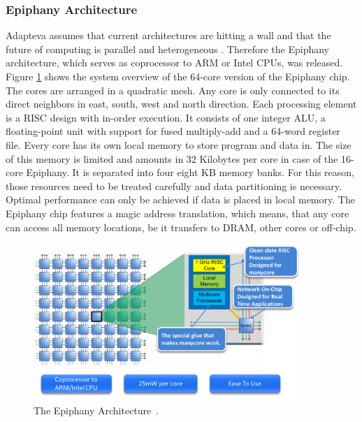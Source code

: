 \documentclass[american, hauptseminar, twoside]{zihpub}
\begin{document}
			\subsubsection{Epiphany Architecture}
				Adapteva assumes that current architectures are hitting a wall and that the future of computing is parallel and heterogeneous \cite{Adaptev2015a}. Therefore the Epiphany architecture, which serves as coprocessor to ARM or Intel CPUs, was released. Figure \ref{fig:epiphany} shows the system overview of the 64-core version of the Epiphany chip. The cores are arranged in a quadratic mesh. Any core is only connected to its direct neighbors in east, south, west and north direction. Each processing element is a RISC design with in-order execution. It consists of one integer ALU, a floating-point unit with support for fused multiply-add and a 64-word register file. Every core has its own local memory to store program and data in. The size of this memory is limited and amounts in 32 Kilobytes per core in case of the 16-core Epiphany. It is separated into four eight KB memory banks. For this reason, those resources need to be treated carefully and data partitioning is necessary. Optimal performance can only be achieved if data is placed in local memory. The Epiphany chip features a magic address translation, which means, that any core can access all memory locations, be it transfers to DRAM, other cores or off-chip. 
				\begin{figure}[H]
					\begin{center}
						\includegraphics[width=0.9\textwidth]{grafiken/epiphany.pdf}
						\caption{The Epiphany Architecture~\cite{Adaptev2015a}.}
						\label{fig:epiphany}
					\end{center}
				\end{figure}
				
\end{document}
